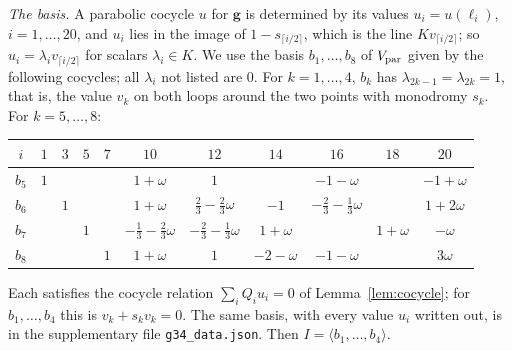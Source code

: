 \documentclass[11pt]{amsart}
\theoremstyle{definition}
\theoremstyle{remark}
\newcommand{\Vp}{V_{\rm par}}
\begin{document}
\emph{The basis.} A parabolic cocycle $u$ for $\mathbf g$ is determined by its values $u_i=u(\ell_i)$, $i=1,\dots,20$, and $u_i$ lies in the image of $1-s_{\lceil i/2\rceil}$, which is the line $Kv_{\lceil i/2\rceil}$; so $u_i=\lambda_iv_{\lceil i/2\rceil}$ for scalars $\lambda_i\in K$. We use the basis $b_1,\dots,b_8$ of $\Vp$ given by the following cocycles; all $\lambda_i$ not listed are $0$. For $k=1,\dots,4$, $b_k$ has $\lambda_{2k-1}=\lambda_{2k}=1$, that is, the value $v_k$ on both loops around the two points with monodromy $s_k$. For $k=5,\dots,8$:
\begin{center}
\small
\begin{tabular}{c|cccccccccc}
$i$ & $1$ & $3$ & $5$ & $7$ & $10$ & $12$ & $14$ & $16$ & $18$ & $20$\\\hline
$b_5$ & $1$ & & & & $1+\omega$ & $1$ & & $-1-\omega$ & & $-1+\omega$\\
$b_6$ & & $1$ & & & $1+\omega$ & $\tfrac23-\tfrac23\omega$ & $-1$ & $-\tfrac23-\tfrac13\omega$ & & $1+2\omega$\\
$b_7$ & & & $1$ & & $-\tfrac13-\tfrac23\omega$ & $-\tfrac23-\tfrac13\omega$ & $1+\omega$ & & $1+\omega$ & $-\omega$\\
$b_8$ & & & & $1$ & $1+\omega$ & $1$ & $-2-\omega$ & $-1-\omega$ & & $3\omega$
\end{tabular}
\end{center}
Each satisfies the cocycle relation $\sum_iQ_iu_i=0$ of Lemma~\ref{lem:cocycle}; for $b_1,\dots,b_4$ this is $v_k+s_kv_k=0$. The same basis, with every value $u_i$ written out, is in the supplementary file \texttt{g34\_data.json}. Then $I=\langle b_1,\dots,b_4\rangle$.
\end{document}
